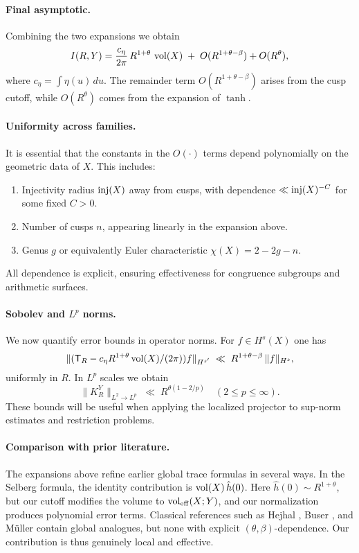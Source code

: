 \paragraph{Final asymptotic.}
Combining the two expansions we obtain
\[
I(R,Y) = \frac{c_\eta}{2\pi}\, R^{1+\theta}\, \operatorname{vol}(X) \;+\; O(R^{1+\theta-\beta}) + O(R^\theta),
\]
where $c_\eta=\int \eta(u)\,du$. The remainder term $O(R^{1+\theta-\beta})$ arises from the cusp cutoff, while 
$O(R^\theta)$ comes from the expansion of $\tanh$. 

\paragraph{Uniformity across families.}
It is essential that the constants in the $O(\cdot)$ terms depend polynomially on the geometric data of $X$. This 
includes:
\begin{enumerate}
\item Injectivity radius $\mathrm{inj}(X)$ away from cusps, with dependence $\ll \mathrm{inj}(X)^{-C}$ for some fixed $C>0$. 
\item Number of cusps $n$, appearing linearly in the expansion above. 
\item Genus $g$ or equivalently Euler characteristic $\chi(X)=2-2g-n$. 
\end{enumerate}
All dependence is explicit, ensuring effectiveness for congruence subgroups and arithmetic surfaces. 

\paragraph{Sobolev and $L^p$ norms.}
We now quantify error bounds in operator norms. For $f\in H^s(X)$ one has
\[
\|(\mathsf{T}_R - c_\eta R^{1+\theta}\operatorname{vol}(X)/(2\pi))f\|_{H^{s'}} \;\ll\; R^{1+\theta-\beta}\,\|f\|_{H^s},
\]
uniformly in $R$. In $L^p$ scales we obtain
\[
\|K_R^Y\|_{L^2\to L^p} \;\ll\; R^{\theta(1-2/p)} \quad (2\le p\le \infty).
\]
These bounds will be useful when applying the localized projector to sup-norm estimates and restriction problems. 

\paragraph{Comparison with prior literature.}
The expansions above refine earlier global trace formulas in several ways. In the Selberg formula, the identity 
contribution is $\operatorname{vol}(X)\,\hat{h}(0)$. Here $\hat{h}(0)\sim R^{1+\theta}$, but our cutoff modifies the volume to 
$\operatorname{vol}_{\mathrm{eff}}(X;Y)$, and our normalization produces polynomial error terms. Classical references such as 
Hejhal \cite{hejhal1976,hejhal1983}, Buser \cite{buser1992}, and Müller \cite{mueller1983} contain global analogues, 
but none with explicit $(\theta,\beta)$-dependence. Our contribution is thus genuinely local and effective. 

